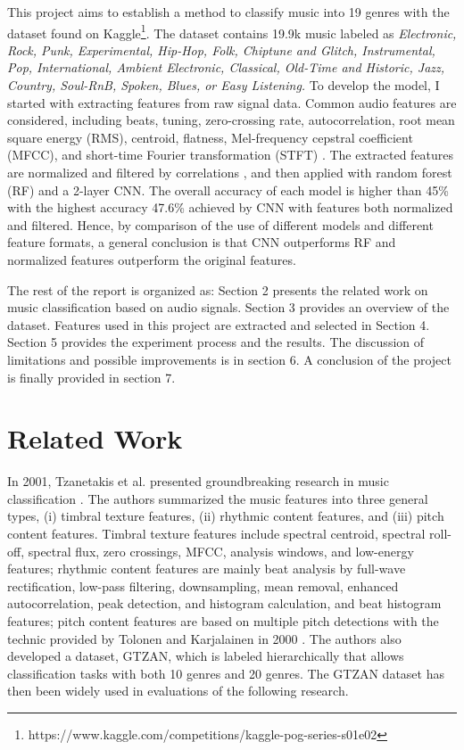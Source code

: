 \documentclass[sigconf ,nonacm]{acmart}
\begin{document}
This project aims to establish a method to classify music into 19 genres with the dataset found on Kaggle\footnote{https://www.kaggle.com/competitions/kaggle-pog-series-s01e02}. The dataset contains 19.9k music labeled as \textit{Electronic, Rock, Punk, Experimental, Hip-Hop, Folk, Chiptune and Glitch, Instrumental, Pop, International, Ambient Electronic, Classical, Old-Time and Historic, Jazz, Country, Soul-RnB, Spoken, Blues, or Easy Listening.} To develop the model, I started with extracting features from raw signal data. Common audio features are considered, including beats, tuning, zero-crossing rate, autocorrelation, root mean square energy (RMS), centroid, flatness, Mel-frequency cepstral coefficient (MFCC), and short-time Fourier transformation (STFT) \cite{peeters2004large,muller2011signal,gtzan}. The extracted features are normalized and filtered by correlations \cite{yu2003feature}, and then applied with random forest (RF) and a 2-layer CNN. The overall accuracy of each model is higher than 45\% with the highest accuracy 47.6\% achieved by CNN with features both normalized and filtered. Hence, by comparison of the use of different models and different feature formats, a general conclusion is that CNN outperforms RF and normalized features outperform the original features. 

The rest of the report is organized as: Section 2 presents the related work on music classification based on audio signals. Section 3 provides an overview of the dataset. Features used in this project are extracted and selected in Section 4. Section 5 provides the experiment process and the results. The discussion of limitations and possible improvements is in section 6. A conclusion of the project is finally provided in section 7.


\section{Related Work}

In 2001, Tzanetakis et al. presented groundbreaking research in music classification \cite{gtzan}. The authors summarized the music features into three general types, (i) timbral texture features, (ii) rhythmic content features, and (iii) pitch content features. Timbral texture features include spectral centroid, spectral roll-off, spectral flux, zero crossings, MFCC, analysis windows, and low-energy features; rhythmic content features are mainly beat analysis by full-wave rectification, low-pass filtering, downsampling, mean removal, enhanced autocorrelation, peak detection, and histogram calculation, and beat histogram features; pitch content features are based on multiple pitch detections with the technic provided by Tolonen and Karjalainen in 2000 \cite{tolonen2000computationally}. The authors also developed a dataset, GTZAN, which is labeled hierarchically that allows classification tasks with both 10 genres and 20 genres. The GTZAN dataset has then been widely used in evaluations of the following research.
\end{document}
